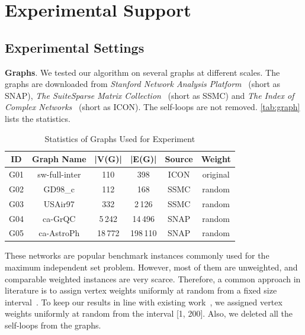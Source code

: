 \documentclass[sigconf, nonacm]{acmart}
\begin{document}
\section{Experimental Support}

\subsection{Experimental Settings}

\noindent\textbf{Graphs}. We tested our algorithm on several graphs at different scales. The graphs are downloaded from \emph{Stanford Network Analysis Platform}~\cite{snapnets} (short as SNAP), \emph{The SuiteSparse Matrix Collection}~\cite{2011The} (short as SSMC) and \emph{The Index of Complex Networks}~\cite{iconnets} (short as ICON). The self-loops are not removed. \autoref{tab:graph} lists the statistics.

\begin{table}[tbp]%
  \caption{Statistics of Graphs Used for Experiment}
  \label{tab:graph}
  \begin{tabular}{cccccc}
    \toprule
    \textbf{ID} & \textbf{Graph Name} & \textbf{|V(G)|} & \textbf{|E(G)|} & \textbf{Source} & \textbf{Weight}\\
    \midrule
    G01 & sw-full-inter & 110 & 398 & ICON & original\\
    G02 & GD98\_c & 112 & 168 & SSMC & random\\
    G03 & USAir97 & 332 & 2\,126 & SSMC & random\\
    G04 & ca-GrQC & 5\,242 & 14\,496 & SNAP & random\\
    G05 & ca-AstroPh & 18\,772 & 198\,110 & SNAP & random\\
  \bottomrule
\end{tabular}
\end{table}

These networks are popular benchmark instances commonly used for the maximum independent set problem. However, most of them are unweighted, and comparable weighted instances are very scarce. Therefore, a common approach in literature is to assign vertex weights uniformly at random from a fixed size interval~\cite{2018Improving,2017An}. To keep our results in line with existing work~\cite{Lamm0SWZ19}, we assigned vertex weights uniformly at random from the interval [1, 200]. Also, we deleted all the self-loops from the graphs.
\end{document}
